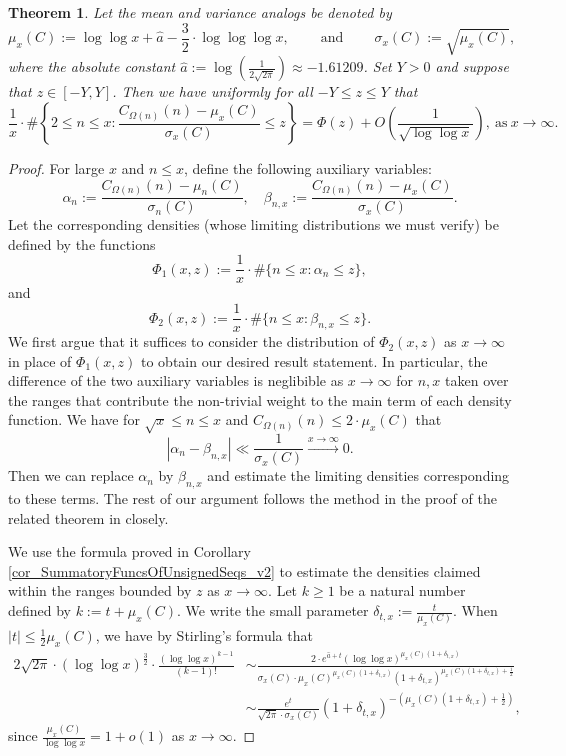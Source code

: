 \documentclass[11pt,reqno,a4letter]{article}
\numberwithin{figure}{section}
\numberwithin{table}{section}
\theoremstyle{plain}
\newtheorem{theorem}{Theorem}
\numberwithin{theorem}{section}
\theoremstyle{definition}
\begin{document}
\begin{theorem} 
\label{theorem_CLT_VI} 
Let the mean and variance analogs be denoted by 
\[
\mu_x(C) := \log\log x + \hat{a} - \frac{3}{2} \cdot \log\log\log x, 
     \qquad \mathrm{\ and\ } \qquad 
     \sigma_x(C) := \sqrt{\mu_x(C)}, 
\]
where the absolute constant 
$\hat{a} := \log\left(\frac{1}{2\sqrt{2\pi}}\right) \approx -1.61209$. 
Set $Y > 0$ and suppose that $z \in [-Y, Y]$. Then we have 
uniformly for all $-Y \leq z \leq Y$ that 
\[
\frac{1}{x} \cdot \#\left\{2 \leq n \leq x: 
     \frac{C_{\Omega(n)}(n) - \mu_x(C)}{\sigma_x(C)} \leq z\right\} = 
     \Phi(z) + O\left(\frac{1}{\sqrt{\log\log x}}\right), 
     \mathrm{\ as\ } x \rightarrow \infty. 
\] 
\end{theorem} 
\begin{proof} 
For large $x$ and $n \leq x$, define the following auxiliary variables: 
\[
\alpha_n := \frac{C_{\Omega(n)}(n) - \mu_n(C)}{\sigma_n(C)}, \quad 
     \beta_{n,x} := \frac{C_{\Omega(n)}(n) - \mu_x(C)}{\sigma_x(C)}. 
\] 
Let the corresponding densities (whose limiting distributions we must verify) 
be defined by the functions 
\[
\Phi_1(x, z) := \frac{1}{x} \cdot \#\{n \leq x: \alpha_n \leq z\}, 
\]
and 
\[
\Phi_2(x, z) := \frac{1}{x} \cdot \#\{n \leq x: \beta_{n,x} \leq z\}. 
\] 
We first argue that it suffices to consider the distribution of $\Phi_2(x, z)$ as 
$x \rightarrow \infty$ in place of $\Phi_1(x, z)$ to obtain our desired result statement. 
In particular, the difference of the two auxiliary variables is neglibible as 
$x \rightarrow \infty$ for $n,x$ taken over the ranges that contribute the non-trivial 
weight to the main term of each density function. We have for 
$\sqrt{x} \leq n \leq x$ and $C_{\Omega(n)}(n) \leq 2 \cdot \mu_x(C)$ that 
\[
|\alpha_n - \beta_{n,x}| \ll \frac{1}{\sigma_x(C)} \xrightarrow{x \rightarrow \infty} 0. 
\]
Then we can replace $\alpha_n$ by $\beta_{n,x}$ and estimate the limiting 
densities corresponding to these terms. 
The rest of our argument follows the method in the proof of the related theorem in 
\cite[Thm.\ 7.21; \S 7.4]{MV} closely. 

We use the formula proved in Corollary \ref{cor_SummatoryFuncsOfUnsignedSeqs_v2} 
to estimate the densities claimed within the ranges bounded by 
$z$ as $x \rightarrow \infty$. 
Let $k \geq 1$ be a natural number defined by $k := t + \mu_x(C)$. 
We write the small parameter $\delta_{t,x} := \frac{t}{\mu_x(C)}$. 
When $|t| \leq \frac{1}{2} \mu_x(C)$, we have by Stirling's formula that 
\begin{align*} 
2\sqrt{2\pi} \cdot (\log\log x)^{\frac{3}{2}} \cdot 
     \frac{(\log\log x)^{k-1}}{(k-1)!} & \sim 
     \frac{2 \cdot e^{\hat{a} + t} 
     (\log\log x)^{\mu_x(C)(1+\delta_{t,x})}}{ 
     \sigma_x(C) \cdot \mu_x(C)^{\mu_x(C) (1 + \delta_{t,x})}
     (1 + \delta_{t,x})^{\mu_x(C) (1 + \delta_{t,x}) + \frac{1}{2}}} \\ 
     & \sim \frac{e^{t}}{\sqrt{2\pi} \cdot \sigma_x(C)} (1 + \delta_{t,x})^{-\left( 
     \mu_x(C) (1 + \delta_{t,x}) + \frac{1}{2}\right)}, 
\end{align*} 
since $\frac{\mu_x(C)}{\log\log x} = 1 + o(1)$ as $x \rightarrow \infty$. 


\end{proof}
\end{document}
